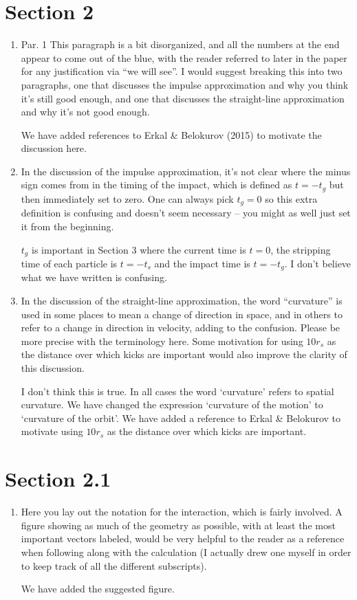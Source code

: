 \documentclass{article}
\begin{document}
\section{Section 2}
\begin{enumerate}
\item Par. 1
This paragraph is a bit disorganized, and all the numbers at the end appear to come out
of the blue, with the reader referred to later in the paper for any justification via “we will
see”. I would suggest breaking this into two paragraphs, one that discusses the impulse
approximation and why you think it’s still good enough, and one that discusses the
straight-line approximation and why it’s not good enough.

{\color{red} We have added references to Erkal \& Belokurov (2015) to motivate the discussion here.}


\item In the discussion of the impulse approximation, it’s not clear where the minus sign
comes from in the timing of the impact, which is defined as $t=-t_g$ but then immediately
set to zero. One can always pick $t_g=0$ so this extra definition is confusing and doesn’t
seem necessary -- you might as well just set it from the beginning.

{\color{red} $t_g$ is important in Section 3 where the current time is $t=0$, the stripping time of each particle is $t=-t_s$ and the impact time is $t=-t_g$. I don't believe what we have written is confusing.}

\item In the discussion of the straight-line approximation, the word “curvature” is used in some
places to mean a change of direction in space, and in others to refer to a change in
direction in velocity, adding to the confusion. Please be more precise with the
terminology here. Some motivation for using $10r_s$ as the distance over which kicks are
important would also improve the clarity of this discussion.

{\color{red} I don't think this is true. In all cases the word `curvature' refers to spatial curvature. We have changed the expression `curvature of the motion' to `curvature of the orbit'. We have added a reference to Erkal \& Belokurov to motivate using $10r_s$ as the distance over which kicks are
important. }

\end{enumerate}
\section{Section 2.1}
\begin{enumerate}
\item Here you lay out the notation for the interaction, which is fairly involved. A figure
showing as much of the geometry as possible, with at least the most important vectors
labeled, would be very helpful to the reader as a reference when following along with
the calculation (I actually drew one myself in order to keep track of all the different
subscripts).

{\color{red} We have added the suggested figure.}

\end{enumerate}
\end{document}
